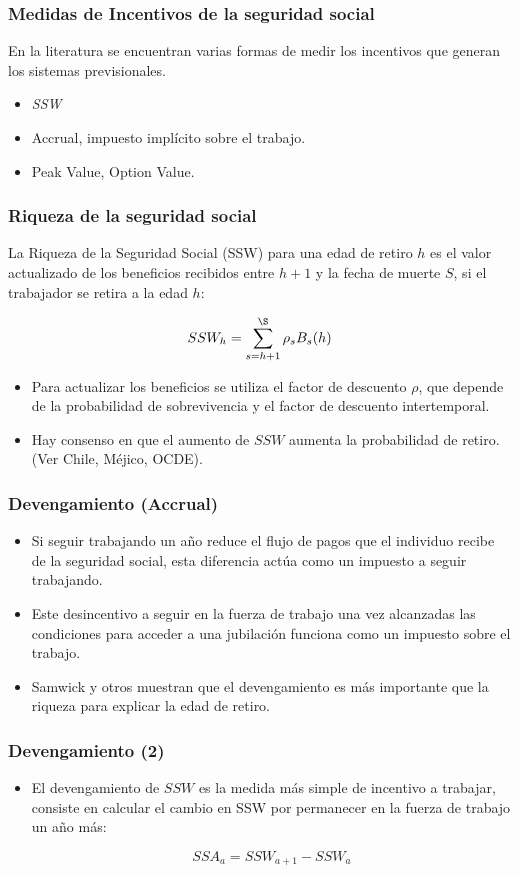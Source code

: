 \documentclass{beamer}
\begin{document}
    \frame
{
  \frametitle{Medidas de Incentivos de la seguridad social}
  
  En la literatura se encuentran varias formas de medir los incentivos que generan los sistemas previsionales.
    \begin{itemize}
    \item \textit{SSW}
    \item Accrual, impuesto implícito sobre el trabajo.
    \item Peak Value, Option Value.
    \end{itemize}
}
\frame
{
  \frametitle{Riqueza de la seguridad social}
  
  La Riqueza de la Seguridad Social (SSW) para una edad de retiro $h$ es el valor actualizado de los beneficios recibidos entre $h + 1$ y la fecha de muerte $S$, si el trabajador se retira a la edad $h$:

\[ SSW_{h} = \sum_{s=h+1}^{\S} \rho_{s} B_{s}(h)\]

  
  \begin{itemize}
  \item Para actualizar los beneficios se utiliza el factor de descuento $\rho$, que depende de la probabilidad de sobrevivencia y el factor de descuento intertemporal. 
  \item Hay consenso en que el aumento de $SSW$ aumenta la probabilidad de retiro. (Ver Chile, Méjico, OCDE).
  \end{itemize} 

}
\frame
{
  \frametitle{Devengamiento (Accrual)}
  
  \begin{itemize}
  \item Si seguir trabajando un año reduce el flujo de pagos que el individuo recibe de la seguridad social, esta diferencia actúa como un impuesto a seguir trabajando. 
  
  \item Este desincentivo a seguir en la fuerza de trabajo una vez alcanzadas las condiciones para acceder a una jubilación funciona como un impuesto sobre el trabajo.
  \item Samwick y otros muestran que el devengamiento es más importante que la riqueza para explicar la edad de retiro.
  \end{itemize}
  }
  \frame
  {
  \frametitle{Devengamiento (2)}
  \begin{itemize}
  \item El devengamiento de $SSW$ es la medida más simple de incentivo a trabajar, consiste en calcular el cambio en SSW por permanecer en la fuerza de trabajo un año más:

\[ SSA_{a} = SSW_{a+1} - SSW_{a}\]
\end{itemize}
}
\end{document}
